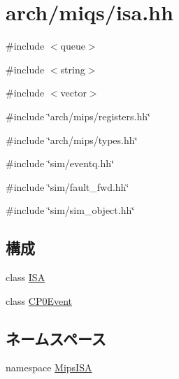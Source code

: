 \hypertarget{miqs_2isa_8hh}{
\section{arch/miqs/isa.hh}
\label{miqs_2isa_8hh}
}
{\ttfamily \#include $<$queue$>$}\par
{\ttfamily \#include $<$string$>$}\par
{\ttfamily \#include $<$vector$>$}\par
{\ttfamily \#include \char`\"{}arch/mips/registers.hh\char`\"{}}\par
{\ttfamily \#include \char`\"{}arch/mips/types.hh\char`\"{}}\par
{\ttfamily \#include \char`\"{}sim/eventq.hh\char`\"{}}\par
{\ttfamily \#include \char`\"{}sim/fault\_\-fwd.hh\char`\"{}}\par
{\ttfamily \#include \char`\"{}sim/sim\_\-object.hh\char`\"{}}\par
\subsection*{構成}
\begin{DoxyCompactItemize}
\item 
class \hyperlink{classMipsISA_1_1ISA}{ISA}
\item 
class \hyperlink{classMipsISA_1_1ISA_1_1CP0Event}{CP0Event}
\end{DoxyCompactItemize}
\subsection*{ネームスペース}
\begin{DoxyCompactItemize}
\item 
namespace \hyperlink{namespaceMipsISA}{MipsISA}
\end{DoxyCompactItemize}
